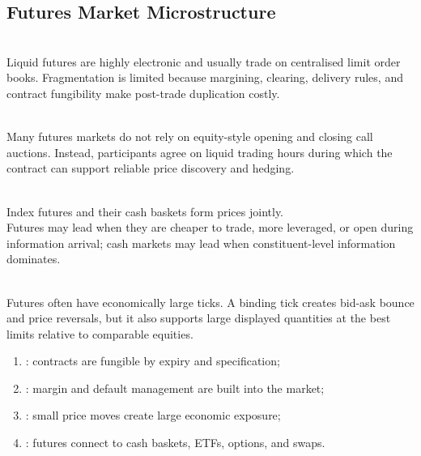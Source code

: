 \subsection{Futures Market Microstructure}

\begin{principle} \\
Liquid futures are highly electronic and usually trade on centralised limit order books. Fragmentation is limited because margining, clearing, delivery rules, and contract fungibility make post-trade duplication costly.
\end{principle}

\begin{caveat} \\
Many futures markets do not rely on equity-style opening and closing call auctions. Instead, participants agree on liquid trading hours during which the contract can support reliable price discovery and hedging.
\end{caveat}

\begin{mechanism} \\
Index futures and their cash baskets form prices jointly.\\
Futures may lead when they are cheaper to trade, more leveraged, or open during information arrival; cash markets may lead when constituent-level information dominates.
\end{mechanism}

\begin{principle} \\
Futures often have economically large ticks. A binding tick creates bid-ask bounce and price reversals, but it also supports large displayed quantities at the best limits relative to comparable equities.
\end{principle}

\begin{taxonomy} 
\begin{enumerate}[label=\roman*.]
\setlength{\itemsep}{0pt}
\item {}: contracts are fungible by expiry and specification;
\item {}: margin and default management are built into the market;
\item {}: small price moves create large economic exposure;
\item {}: futures connect to cash baskets, ETFs, options, and swaps.
\end{enumerate}
\end{taxonomy}

